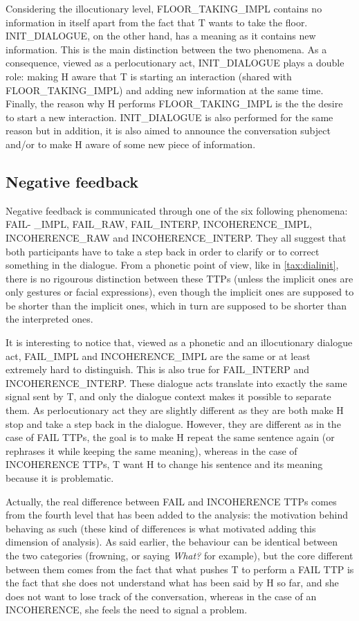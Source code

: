 	 Considering the illocutionary level, FLOOR\_TAKING\_IMPL contains no information in itself apart from the fact that T wants to take the floor. INIT\_DIALOGUE, on the other hand, has a meaning as it contains new information. This is the main distinction between the two phenomena. As a consequence, viewed as a perlocutionary act, INIT\_DIALOGUE plays a double role: making H aware that T is starting an interaction (shared with FLOOR\_TAKING\_IMPL) and adding new information at the same time. Finally, the reason why H performs FLOOR\_TAKING\_IMPL is the the desire to start a new interaction. INIT\_DIALOGUE is also performed for the same reason but in addition, it is also aimed to announce the conversation subject and/or to make H aware of some new piece of information.

    \subsection{Negative feedback}

         Negative feedback is communicated through one of the six following phenomena: FAIL- \_IMPL, FAIL\_RAW, FAIL\_INTERP, INCOHERENCE\_IMPL, INCOHERENCE\_RAW and INCOHERENCE\_INTERP. They all suggest that both participants have to take a step back in order to clarify or to correct something in the dialogue. From a phonetic point of view, like in \ref{tax:dialinit}, there is no rigourous distinction between these TTPs (unless the implicit ones are only gestures or facial expressions), even though the implicit ones are supposed to be shorter than the implicit ones, which in turn are supposed to be shorter than the interpreted ones.

         It is interesting to notice that, viewed as a phonetic and an illocutionary dialogue act, FAIL\_IMPL and INCOHERENCE\_IMPL are the same or at least extremely hard to distinguish. This is also true for FAIL\_INTERP and INCOHERENCE\_INTERP. These dialogue acts translate into exactly the same signal sent by T, and only the dialogue context makes it possible to separate them. As perlocutionary act they are slightly different as they are both make H stop and take a step back in the dialogue. However, they are different as in the case of FAIL TTPs, the goal is to make H repeat the same sentence again (or rephrases it while keeping the same meaning), whereas in the case of INCOHERENCE TTPs, T want H to change his sentence and its meaning because it is problematic.

         Actually, the real difference between FAIL and INCOHERENCE TTPs comes from the fourth level that has been added to the analysis: the motivation behind behaving as such (these kind of differences is what motivated adding this dimension of analysis). As said earlier, the behaviour can be identical between the two categories (frowning, or saying \textit{What?} for example), but the core different between them comes from the fact that what pushes T to perform a FAIL TTP is the fact that she does not understand what has been said by H so far, and she does not want to lose track of the conversation, whereas in the case of an INCOHERENCE, she feels the need to signal a problem.

